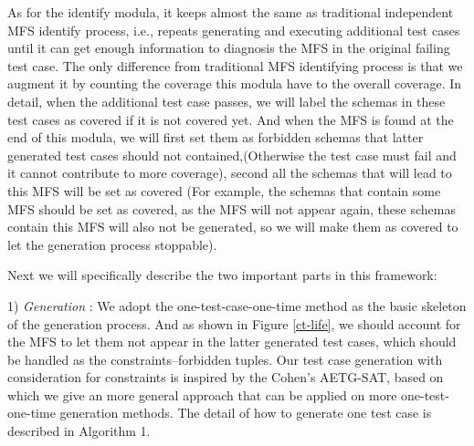 \documentclass{sig-alternate}
\begin{document}
As for the identify modula, it keeps almost the same as traditional independent MFS identify process, i.e., repeats generating and executing additional test cases until it can get enough information to diagnosis the MFS in the original failing test case. The only difference from traditional MFS identifying process is that we augment it by counting the coverage this modula have to the overall coverage. In detail, when the additional test case passes, we will label the schemas in these test cases as covered if it is not covered yet. And when the MFS is found at the end of this modula, we will first set them as forbidden schemas that latter generated test cases should not contained,(Otherwise the test case must fail and it cannot contribute to more coverage), second all the schemas that will lead to this MFS will be set as covered  (For example, the schemas that contain some MFS should be set as covered, as the MFS will not appear again, these schemas contain this MFS will also not be generated, so we will make them as covered to let the generation process stoppable).
%



Next we will specifically describe the two important parts in this framework:

1) \emph{Generation} :
We adopt the one-test-case-one-time method as the basic skeleton of the generation process. And as shown in Figure \ref{ct-life}, we should account for the MFS to let them not appear in the latter generated test cases, which should be handled as the constraints--forbidden tuples. Our test case generation with consideration for constraints is inspired by the Cohen's AETG-SAT, based on which we give an more general approach that can be applied on more one-test-one-time generation methods.  The detail of how to generate one test case is described in Algorithm 1.
\end{document}
